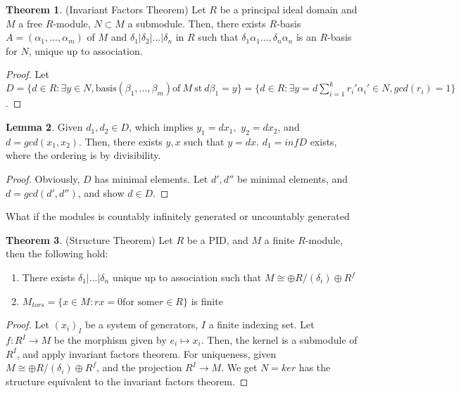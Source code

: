 \documentclass{article}
\theoremstyle{definition}
\newtheorem{theorem}{Theorem}[section]
\theoremstyle{definition}
\theoremstyle{definition}
\theoremstyle{definition}
\newtheorem{lemma}[theorem]{Lemma}
\theoremstyle{definition}
\theoremstyle{definition}
\theoremstyle{definition}
\begin{document}
\begin{tcolorbox}[colback=red!5!white,colframe=red!30!white]
\begin{theorem}
(Invariant Factors Theorem) Let $R$ be a principal ideal domain and $M$ a free $R$-module, $N\subset M$ a submodule. Then, there exists $R$-basis $A=(\alpha_1,...,\alpha_m)$ of $M$ and $\delta_1|\delta_2|...|\delta_n$ in $R$ such that $\delta_1\alpha_1...,\delta_n\alpha_n$ is an $R$-basis for $N$, unique up to association. 
\end{theorem}
\end{tcolorbox}
\begin{proof}
    Let $D=\{ d\in R: \exists y\in N, \textrm{basis} (\beta_1,...,\beta_m) \textrm{of} \  M \ \textrm{st} \  d\beta_1=y \}=\{ d\in R:\exists y=d \sum_{i=1}^{k}r_i'\alpha_i'\in N, gcd(r_i)=1 \}$.
\end{proof}

\begin{tcolorbox}
    \begin{lemma}
        Given $d_1,d_2\in D$, which implies $y_1=dx_1,$ $y_2=dx_2$, and $d=gcd(x_1,x_2)$. Then, there exists $y,x$ such that $y=dx$.
    $d_1=inf D$ exists, where the ordering is by divisibility. 
    \end{lemma}
    \end{tcolorbox}

    \begin{proof}
        Obviously, $D$ has minimal elements. Let $d',d''$ be minimal elements, and $d=gcd(d',d'')$, and show $d\in D$. 
    \end{proof}

    What if the modules is countably infinitely generated or uncountably generated

    
    \begin{tcolorbox}[colback=red!5!white,colframe=red!30!white]
    \begin{theorem}
    (Structure Theorem) Let $R$ be a PID, and $M$ a finite $R$-module, then the following hold:
    \begin{enumerate}
        \item There exists $\delta_1|...|\delta_n$ unique up to association such that $M\cong \oplus R/(\delta_i)\oplus R^f$
        \item $M_{tors}=\{ x\in M:rx=0 \textrm{for some} r\in R  \}$ is finite
    \end{enumerate}
    \end{theorem}
    \end{tcolorbox}
\begin{proof}
    Let $(x_i)_{I}$ be a system of generators, $I$ a finite indexing set. Let $f:R^I\to M$ be the morphism given by $e_i\mapsto x_i$. Then, the kernel is a submodule of $R^I$, and apply invariant factors theorem. For uniqueness, given $M\cong \oplus R/(\delta_i)\oplus R^f$, and the projection $R^I\to M$. We get $
    N=ker$ has the structure equivalent to the invariant factors theorem.  
\end{proof}
\end{document}
